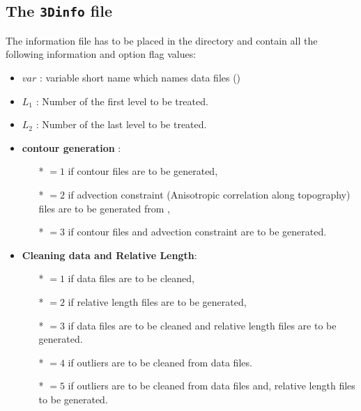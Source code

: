 \subsection{The \texttt{3Dinfo} file \label{sec:3Dinfo}}

The information file  has to be placed in the  directory and contain all the following information and option flag values:

\begin{itemize}
\item $var$ :  variable short name which names data files ()
\item $L_1$ :  Number of the first level to be treated. 
\item $L_2$ :  Number of the last level to be treated.
\item {\bf contour generation} : 
              \begin{itemize}
                \item[*] $=1$ if contour files are to be generated,
                \item[*] $=2$ if advection constraint (Anisotropic correlation along topography) files are to be generated from ,
                \item[*] $=3$ if contour files and advection constraint are to be generated.
              \end{itemize}
\item {\bf Cleaning data and Relative Length}: 
              \begin{itemize}
                \item[*] $=1$ if data files are to be cleaned,
                \item[*] $=2$ if relative length files are to be generated,
                \item[*] $=3$ if data files are to be cleaned and relative length files are to be generated.
                \item[*] $=4$ if outliers are to be cleaned from data files.
                \item[*] $=5$ if outliers are to be cleaned from data files and, relative length files to be generated.
              \end{itemize}



\end{itemize}
